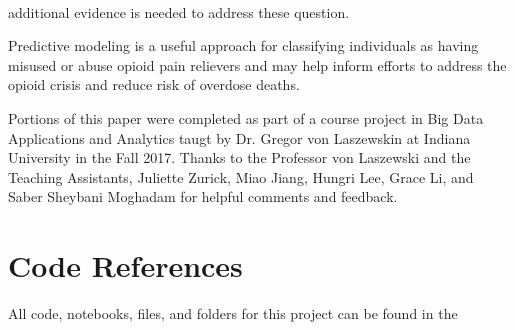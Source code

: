 \\\documentclass[sigconf]{acmart}
\begin{document}
additional evidence is needed to address these question. 

Predictive modeling is a useful approach for classifying individuals as 
having misused or abuse opioid pain relievers and may help inform 
efforts to address the opioid crisis and reduce risk of overdose deaths. 


\begin{acks}

Portions of this paper were completed as part of a course project in Big Data 
Applications and Analytics taugt by Dr. Gregor von Laszewskin at Indiana 
University in the Fall 2017. Thanks to the Professor von Laszewski and the
Teaching Assistants, Juliette Zurick, Miao Jiang, Hungri Lee, Grace Li, and 
Saber Sheybani Moghadam for helpful comments and feedback.

\end{acks}

 


\appendix

\section{Code References}
All code, notebooks, files, and folders for this project can be found in the



%
\end{document}
